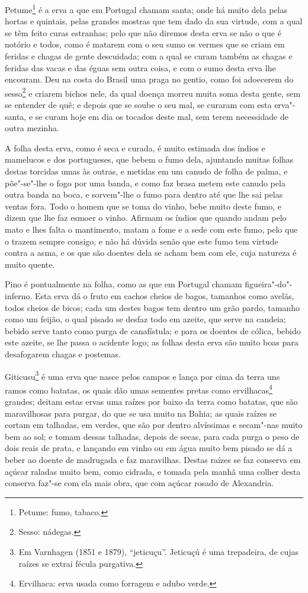 Petume\footnote{ Petume: fumo, tabaco.} é a erva a que em Portugal chamam santa; onde há
muito dela pelas hortas e quintais, pelas grandes mostras que tem dado da sua virtude, com
a qual se têm feito curas estranhas; pelo que não diremos desta erva se não o que é
notório e todos, como é matarem com o seu sumo os vermes que se criam em feridas e chagas
de gente descuidada; com a qual se curam também as chagas e feridas das vacas e das éguas
sem outra coisa, e com o sumo desta erva lhe encouram. Deu na costa do Brasil uma praga no
gentio, como foi adoecerem do sesso\footnote{ Sesso: nádegas.} e criarem bichos
nele, da qual doença morreu muita soma desta gente, sem se entender de quê; e depois que
se soube o seu mal, se curaram com esta erva"-santa, e se curam hoje em dia os tocados
deste mal, sem terem necessidade de outra mezinha.

A folha desta erva, como é seca e curada, é muito estimada dos índios e mamelucos e dos
portugueses, que bebem o fumo dela, ajuntando muitas folhas destas torcidas umas às
outras, e metidas em um canudo de folha de palma, e põe"-se"-lhe o fogo por uma banda, e
como faz brasa metem este canudo pela outra banda na boca, e sorvem"-lhe o fumo para dentro
até que lhe sai pelas ventas fora. Todo o homem que se toma do vinho, bebe muito deste
fumo, e dizem que lhe faz esmoer o vinho. Afirmam os índios que quando andam pelo mato e
lhes falta o mantimento, matam a fome e a sede com este fumo, pelo que o trazem sempre
consigo, e não há dúvida senão que este fumo tem virtude contra a asma, e os que são
doentes dela se acham bem com ele, cuja natureza é muito quente.

Pino é pontualmente na folha, como as que em Portugal chamam figueira"-do"-inferno. Esta
erva dá o fruto em cachos cheios de bagos, tamanhos como avelãs, todos cheios de bicos;
cada um destes bagos tem dentro um grão pardo, tamanho como um feijão, o qual pisado se
desfaz todo em azeite, que serve na candeia; bebido serve tanto como purga de canafístula;
e para os doentes de cólica, bebido este azeite, se lhe passa o acidente logo; as folhas
desta erva são muito boas para desafogarem chagas e postemas.

Giticusu\footnote{ Em Varnhagen (1851 e 1879), ``jeticuçu''. Jeticuçú é uma trepadeira, de
cujas raízes se extrai fécula purgativa.} é uma erva que nasce pelos campos e lança por
cima da terra uns ramos como batatas, os quais dão umas sementes pretas como
ervilhacas\footnote{ Ervilhaca: erva usada como forragem e adubo verde.} grandes; deitam
estas ervas uma raízes por baixo da terra como batatas, que são maravilhosas para purgar,
do que se usa muito na Bahia; as quais raízes se cortam em talhadas, em verdes, que são
por dentro alvíssimas e secam"-nas muito bem ao sol; e tomam dessas talhadas, depois de
secas, para cada purga o peso de dois reais de prata, e lançando em vinho ou em água muito
bem pisado se dá a beber ao doente de madrugada e faz maravilhas. Destas raízes se faz
conserva em açúcar raladas muito bem, como cidrada, e tomada pela manhã uma colher desta
conserva faz"-se com ela mais obra, que com açúcar rosado de Alexandria.

